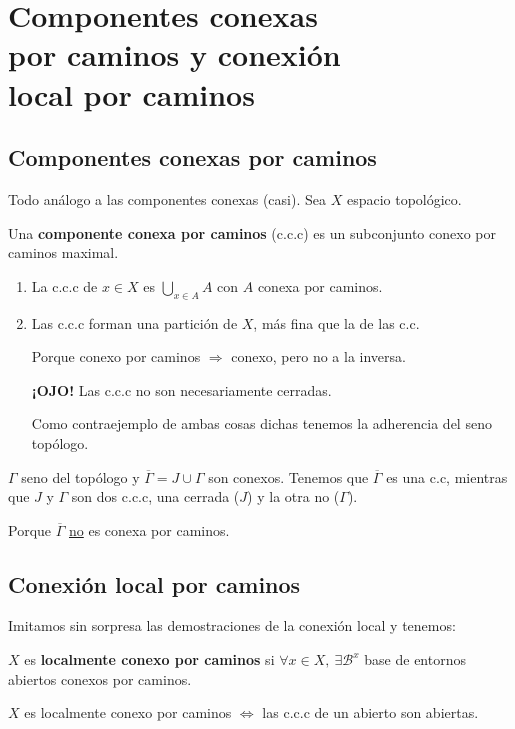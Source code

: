 \chapter{Componentes conexas\texorpdfstring{\\}{} por caminos y conexión\texorpdfstring{\\}{} local por caminos}%
\label{cha:componentes_conexas_por_caminos_y_conexion_local_por_caminos}
\section{Componentes conexas por caminos}%
\label{sec:componentes_conexas_por_caminos}
Todo análogo a las componentes conexas (casi). Sea $X$ espacio topológico.
\begin{defi}
Una \textbf{componente conexa por caminos} (c.c.c) es un subconjunto conexo por caminos maximal.
\end{defi}
\begin{prop}[Descripción]
\begin{enumerate}
    \item La c.c.c de $x \in X$ es $\bigcup_{x \in A} A$ con $A$ conexa por caminos.
    \item Las c.c.c forman una partición de $X$, más fina que la de las c.c.
    \begin{demo}
        Porque conexo por caminos $\Rightarrow$ conexo, pero no a la inversa.

        \textbf{¡OJO!} Las c.c.c no son necesariamente cerradas. 

        Como contraejemplo de ambas cosas dichas tenemos la adherencia del seno topólogo. 
    \end{demo}
\end{enumerate} 
\end{prop}

\begin{ej}
    $\Gamma$ seno del topólogo y $\overline{\Gamma} = J \cup \Gamma$ son conexos. Tenemos que $\overline{\Gamma}$ es una c.c, mientras que $J$ y $\Gamma$ son dos c.c.c, una cerrada ($J$) y la otra no ($\Gamma$). 
    \begin{demo}
    Porque $\overline{\Gamma}$ \underline{no} es conexa por caminos.
    \end{demo}
\end{ej}

\section{Conexión local por caminos}%
\label{sec:conexion_local_por_caminos}
Imitamos sin sorpresa las demostraciones de la conexión local y tenemos:
\begin{defi}
$X$ es \textbf{localmente conexo por caminos} si $\forall x \in X,\ \exists \mathcal{B}^x$ base de entornos abiertos conexos por caminos.
\end{defi}
\begin{prop}
$X$ es localmente conexo por caminos $\Leftrightarrow$ las c.c.c de un abierto son abiertas.
\end{prop}


